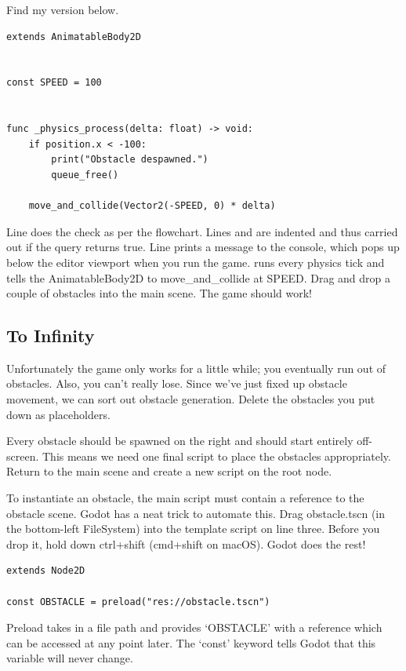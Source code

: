 \documentclass[14pt]{extarticle}
\newcommand{\encircle}[1]{\tikz[baseline=(char.base)]{\node[shape=circle,draw,inner sep=1pt] (char) {#1};}}
\begin{document}
Find my version below.

\clearpage
\begin{lstlisting}[language=gdscript, label={lst:the-template-script}, caption=The template script]
extends AnimatableBody2D


const SPEED = 100


func _physics_process(delta: float) -> void:
	if position.x < -100:
		print("Obstacle despawned.")
		queue_free()
	
	move_and_collide(Vector2(-SPEED, 0) * delta)
\end{lstlisting}

Line \encircle{8} does the check as per the flowchart. Lines \encircle{9} and \encircle{10} are indented and thus carried out if the query returns true. Line \encircle{9} prints a message to the console, which pops up below the editor viewport when you run the game. \encircle{12} runs every physics tick and tells the AnimatableBody2D to move\_and\_collide at SPEED. Drag and drop a couple of obstacles into the main scene. The game should work!

\subsection*{To Infinity}
Unfortunately the game only works for a little while; you eventually run out of obstacles. Also, you can't really lose. Since we've just fixed up obstacle movement, we can sort out obstacle generation. Delete the obstacles you put down as placeholders.

Every obstacle should be spawned on the right and should start entirely off-screen. This means we need one final script to place the obstacles appropriately. Return to the main scene and create a new script on the root node.

To instantiate an obstacle, the main script must contain a reference to the obstacle scene. Godot has a neat trick to automate this. Drag obstacle.tscn (in the bottom-left FileSystem) into the template script on line three. Before you drop it, hold down ctrl+shift (cmd+shift on macOS). Godot does the rest!

\begin{lstlisting}[language=gdscript, label={lst:obstacle-preload}, caption=Preloading the obstacle]
extends Node2D

const OBSTACLE = preload("res://obstacle.tscn")
\end{lstlisting}

Preload takes in a file path and provides `OBSTACLE' with a reference which can be accessed at any point later. The `const' keyword tells Godot that this variable will never change.
\end{document}
